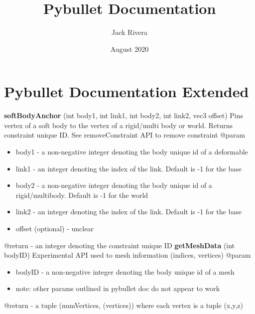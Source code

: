 \documentclass{article}
\title{Pybullet Documentation}
\author{Jack Rivera}
\date{August 2020}
\begin{document}
\section{Pybullet Documentation Extended}

\vspace{0.4cm}
\textbf{softBodyAnchor} (int body1, int link1, int body2, int link2, vec3 offset)
\newline Pins vertex of a soft body to the vertex of a rigid/multi body or world. Returns constraint unique ID. See removeConstraint API to remove constraint
\vspace{0.2cm}
\newline @param
\begin{itemize}
    \item body1 - a non-negative integer denoting the body unique id of a deformable
    \item link1 - an integer denoting the index of the link. Default is -1 for the base
    \item body2 - a non-negative integer denoting the body unique id of a rigid/multibody. Default is -1 for the world
    \item link2 - an integer denoting the index of the link. Default is -1 for the base
    \item offset (optional) - unclear
\end{itemize}
@return - an integer denoting the constraint unique ID
\vspace{0.4cm}
\newline
\textbf{getMeshData} (int bodyID)
\newline Experimental API used to mesh information (indices, vertices)
\vspace{0.2cm}
\newline @param
\begin{itemize}
    \item bodyID - a non-negative integer denoting the body unique id of a mesh
    \item note: other params outlined in pybullet doc do not appear to work
\end{itemize}
@return - a tuple (numVertices, (vertices)) where each vertex is a tuple (x,y,z) 
\end{document}
